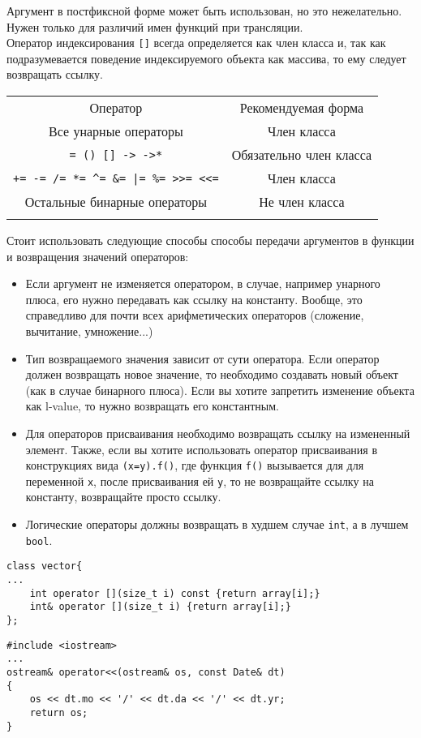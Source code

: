 \documentclass {article}
\begin{document}
Аргумент в постфиксной форме может быть использован, но это нежелательно. Нужен только для различий имен функций при трансляции.\\
Оператор индексирования \texttt{[]} всегда определяется как член класса и, так как подразумевается поведение индексируемого объекта как массива, то ему следует возвращать ссылку.
\begin{center}
\begin{tabular}{c c}
\rowcolor[rgb]{0.58,0.78,0.2} Оператор & Рекомендуемая форма\\\tabrowsep
\rowcolor[rgb]{0.7,0.7,0.7} Все унарные операторы & Член класса \\\tabrowsep
\rowcolor[rgb]{0.7,0.7,0.7} \texttt{= () [] -> ->*} & Обязательно член класса \\\tabrowsep
\rowcolor[rgb]{0.7,0.7,0.7} \texttt{+= -= /= *= \^}\texttt{= \&= |= \%= >>= <<=} & Член класса \\\tabrowsep
\rowcolor[rgb]{0.7,0.7,0.7} Остальные бинарные операторы & Не член класса\\\tabrowsep
\end{tabular}
\end{center}
Стоит использовать следующие способы способы передачи аргументов в функции и возвращения значений операторов:
\begin{itemize}
\item Если аргумент не изменяется оператором, в случае, например унарного плюса, его нужно передавать как ссылку на константу. Вообще, это справедливо для почти всех арифметических операторов (сложение, вычитание, умножение...)
\item Тип возвращаемого значения зависит от сути оператора. Если оператор должен возвращать новое значение, то необходимо создавать новый объект (как в случае бинарного плюса). Если вы хотите запретить изменение объекта как l-value, то нужно возвращать его константным.
\item Для операторов присваивания необходимо возвращать ссылку на измененный элемент. Также, если вы хотите использовать оператор присваивания в конструкциях вида \texttt{(x=y).f()}, где функция \texttt{f()} вызывается для для переменной \texttt{x}, после присваивания ей \texttt{y}, то не возвращайте ссылку на константу, возвращайте просто ссылку.
\item Логические операторы должны возвращать в худшем случае \texttt{int}, а в лучшем \texttt{bool}.
\end{itemize}
\begin{lstlisting}[caption=Перегрузка специальных символов]
class vector{
...
    int operator [](size_t i) const {return array[i];}  
    int& operator [](size_t i) {return array[i];}     
};
\end{lstlisting}
\begin{lstlisting}[caption=Перегрузка оператора вывода]
#include <iostream>
...
ostream& operator<<(ostream& os, const Date& dt)  
{  
    os << dt.mo << '/' << dt.da << '/' << dt.yr;  
    return os;  
}  
\end{lstlisting}
\end{document}
